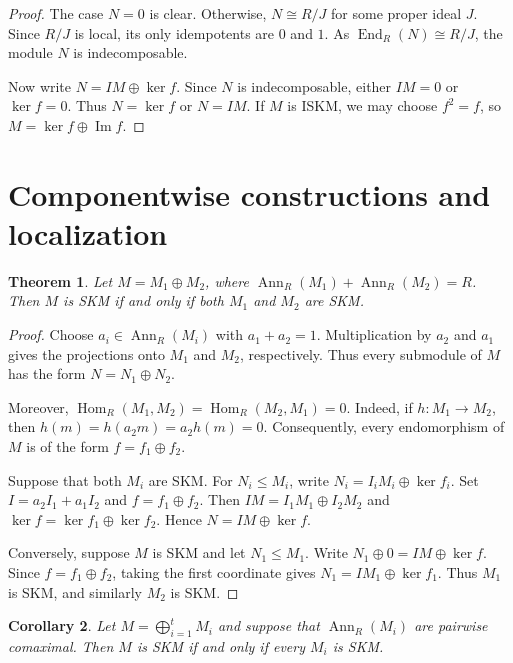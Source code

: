 \documentclass[11pt,a4paper]{article}
\newtheorem{theorem}{Theorem}[section]
\newtheorem{corollary}[theorem]{Corollary}
\theoremstyle{definition}
\theoremstyle{remark}
\begin{document}
\begin{proof}
The case $N=0$ is clear. Otherwise, $N\cong R/J$ for some proper ideal $J$. Since $R/J$ is local, its only idempotents are $0$ and $1$. As $\operatorname{End}_R(N)\cong R/J$, the module $N$ is indecomposable.

Now write $N=IM\oplus\ker f$. Since $N$ is indecomposable, either $IM=0$ or $\ker f=0$. Thus $N=\ker f$ or $N=IM$. If $M$ is ISKM, we may choose $f^2=f$, so $M=\ker f\oplus\operatorname{Im}f$.
\end{proof}



\section{Componentwise constructions and localization}

\begin{theorem}\label{thm:comax}
Let $M=M_1\oplus M_2$, where
$\operatorname{Ann}_R(M_1)+\operatorname{Ann}_R(M_2)=R$.
Then $M$ is SKM if and only if both $M_1$ and $M_2$ are SKM.
\end{theorem}

\begin{proof}
Choose $a_i\in\operatorname{Ann}_R(M_i)$ with $a_1+a_2=1$.
Multiplication by $a_2$ and $a_1$ gives the projections onto
$M_1$ and $M_2$, respectively. Thus every submodule of $M$
has the form $N=N_1\oplus N_2$.

Moreover, $\operatorname{Hom}_R(M_1,M_2)=
\operatorname{Hom}_R(M_2,M_1)=0$.
Indeed, if $h:M_1\to M_2$, then
$h(m)=h(a_2m)=a_2h(m)=0$.
Consequently, every endomorphism of $M$ is of the form
$f=f_1\oplus f_2$.

Suppose that both $M_i$ are SKM. For
$N_i\leq M_i$, write
$N_i=I_iM_i\oplus\ker f_i$.
Set $I=a_2I_1+a_1I_2$ and $f=f_1\oplus f_2$.
Then $IM=I_1M_1\oplus I_2M_2$ and
$\ker f=\ker f_1\oplus\ker f_2$.
Hence $N=IM\oplus\ker f$.

Conversely, suppose $M$ is SKM and let $N_1\leq M_1$.
Write $N_1\oplus0=IM\oplus\ker f$.
Since $f=f_1\oplus f_2$, taking the first coordinate gives
$N_1=IM_1\oplus\ker f_1$.
Thus $M_1$ is SKM, and similarly $M_2$ is SKM.
\end{proof}

\begin{corollary}
Let $M=\bigoplus_{i=1}^tM_i$ and suppose that
$\operatorname{Ann}_R(M_i)$ are pairwise comaximal.
Then $M$ is SKM if and only if every $M_i$ is SKM.
\end{corollary}
\end{document}
